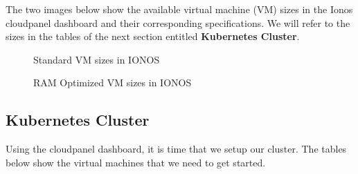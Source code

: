 The two images below show the available virtual machine (VM) sizes in the Ionos cloudpanel dashboard and their corresponding specifications.
We will refer to the sizes in the tables of the next section entitled \textbf{Kubernetes Cluster}.
\begin{figure}[H]
    \centering
    \caption{Standard VM sizes in IONOS}
    \label{fig:standard-vm-sizes}
\end{figure}
\begin{figure}[H]
    \centering
    \caption{RAM Optimized VM sizes in IONOS}
    \label{fig:ram-optimized-vm-sizes}
\end{figure}

\subsection{Kubernetes Cluster}
Using the cloudpanel dashboard, it is time that we setup our cluster.
The tables below show the virtual machines that we need to get started.

